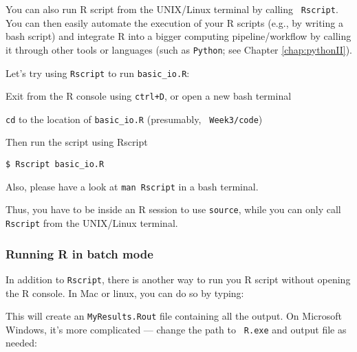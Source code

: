 You can also run R script from the UNIX/Linux terminal by calling {\tt 
Rscript}. You can then easily automate the execution of your R scripts 
(e.g., by writing a bash script) and integrate R into a bigger 
computing pipeline/workflow by calling it through other tools or 
languages (such as {\tt Python}; see Chapter \ref{chap:pythonII}). 

Let's try using {\tt Rscript} to run {\tt basic\_io.R}: 

\begin{compactitem}[$\quad\star$]
	\item Exit from the R console using {\tt ctrl+D}, or open a new 
	bash terminal
	
	\item {\tt cd} to the location of {\tt basic\_io.R} (presumably, {\tt 
	Week3/code})
	
	\item Then run the script using Rscript 
\begin{lstlisting}
$ Rscript basic_io.R 
\end{lstlisting}
	
\end{compactitem}

Also, please have a look at {\tt man Rscript} in a bash terminal.

\begin{tipbox}
Thus, you have to be inside an R session to use {\tt source}, while 
you can only call {\tt Rscript} from the UNIX/Linux terminal.
\end{tipbox}  

\subsubsection{Running R in batch mode}

In addition to {\tt Rscript}, there is another way to run you R script 
without opening the R console. In Mac or linux, you can do so by 
typing:


This will create an {\tt MyResults.Rout} file containing all the output. 
On Microsoft Windows, it's more complicated --- change the path to {\tt 
R.exe} and output file as needed: 

  
